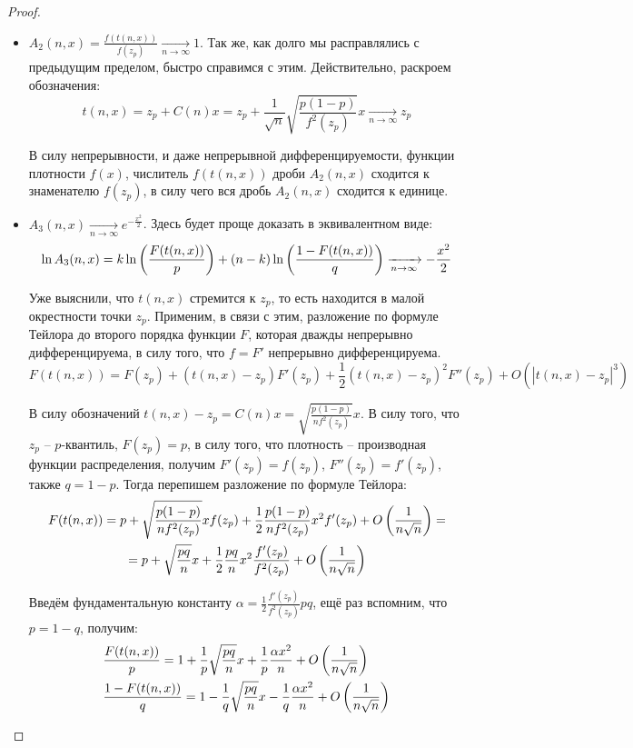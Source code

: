 \begin{proof}
\begin{itemize}
        \item $A_2(n, x) = \frac{f(t(n, x))}{f(z_p)} \xrightarrow[n \to \infty]{} 1$. Так же, как долго мы расправлялись с предыдущим пределом, быстро справимся с этим. Действительно, раскроем обозначения:
        \[
            t(n, x) = z_p + C(n)x = z_p + \frac{1}{\sqrt{n}} \sqrt{\frac{p(1-p)}{f^2(z_p)}} x \xrightarrow[n \to \infty]{} z_p
        \]

        В силу непрерывности, и даже непрерывной дифференцируемости, функции плотности $f(x)$, числитель $f(t(n, x))$ дроби $A_2(n, x)$ сходится к знаменателю $f(z_p)$, в силу чего вся дробь $A_2(n, x)$ сходится к единице.

        \item $A_3(n, x) \xrightarrow[n \to \infty]{} e^{-\frac{x^2}{2}}$. Здесь будет проще доказать в эквивалентном виде:
        \[
            \ln A_3(n, x) = k \ln \left(\frac{F(t(n, x))}{p}\right) + (n-k) \ln \left(\frac{1-F(t(n, x))}{q}\right) \xrightarrow[n \to \infty]{} -\frac{x^2}{2}
        \]

        Уже выяснили, что $t(n, x)$ стремится к $z_p$, то есть находится в малой окрестности точки $z_p$. Применим, в связи с этим, разложение по формуле Тейлора до второго порядка функции $F$, которая дважды непрерывно дифференцируема, в силу того, что $f = F'$ непрерывно дифференцируема.
        \[
            F(t(n, x)) = F(z_p) + (t(n, x) - z_p) F'(z_p) + \frac{1}{2} (t(n, x) - z_p)^2 F''(z_p) + O(|t(n, x) - z_p|^3)
        \]

        В силу обозначений $t(n, x) - z_p = C(n) x = \sqrt{\frac{p(1-p)}{n f^2(z_p)}} x$. В силу того, что $z_p$ -- $p$-квантиль, $F(z_p) = p$, в силу того, что плотность -- производная функции распределения, получим $F'(z_p) = f(z_p)$, $F''(z_p) = f'(z_p)$, также $q = 1-p$. Тогда перепишем разложение по формуле Тейлора:
        \begin{multline*}
            F(t(n, x)) = p + \sqrt{\frac{p(1-p)}{n f^2(z_p)}} x f(z_p) + \frac{1}{2} \frac{p(1-p)}{n f^2(z_p)} x^2 f'(z_p) + O\left(\frac{1}{n \sqrt{n}}\right) =
            \\
            = p + \sqrt{\frac{pq}{n}} x + \frac{1}{2} \frac{pq}{n} x^2 \frac{f'(z_p)}{f^2(z_p)} + O\left(\frac{1}{n \sqrt{n}}\right)
        \end{multline*}

        Введём фундаментальную константу $\alpha = \frac{1}{2} \frac{f'(z_p)}{f^2(z_p)} pq$, ещё раз вспомним, что $p = 1-q$, получим:
        \begin{align*}
            & \frac{F(t(n, x))}{p} = 1 + \frac{1}{p} \sqrt{\frac{pq}{n}} x + \frac{1}{p} \frac{\alpha x^2}{n} + O\left(\frac{1}{n \sqrt{n}}\right)
            \\
            & \frac{1-F(t(n, x))}{q} = 1 - \frac{1}{q} \sqrt{\frac{pq}{n}} x - \frac{1}{q} \frac{\alpha x^2}{n} + O\left(\frac{1}{n \sqrt{n}}\right)
        \end{align*}


\end{itemize}
\end{proof}
